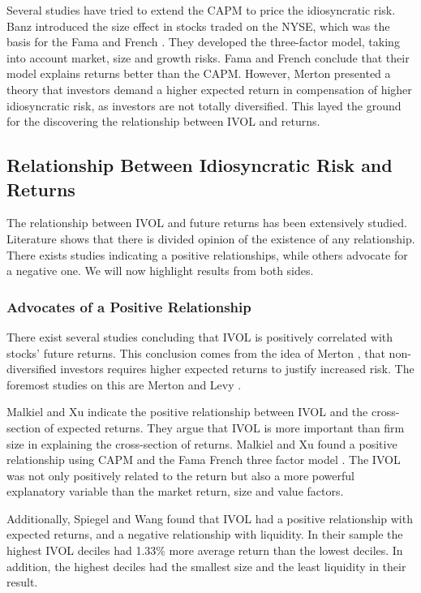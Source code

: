 Several studies have tried to extend the CAPM to price the idiosyncratic risk. Banz \cite{banz} introduced the size effect in stocks traded on the NYSE, which was the basis for the Fama and French \cite{famafrench}. They developed the three-factor model, taking into account market, size and growth risks. Fama and French \cite{famafrench} conclude that their model explains returns better than the CAPM. However, Merton \cite{merton87} presented a theory that investors demand a higher expected return in compensation of higher idiosyncratic risk, as investors are not totally diversified. This layed the ground for the discovering the relationship between IVOL and returns.

\subsection{Relationship Between Idiosyncratic Risk and Returns}
The relationship between IVOL and future returns has been extensively studied. Literature shows that there is divided opinion of the existence of any relationship. There exists studies indicating a positive relationships, while others advocate for a negative one. We will now highlight results from both sides.

\subsubsection{Advocates of a Positive Relationship}
There exist several studies concluding that IVOL is positively correlated with stocks' future returns. This conclusion comes from the idea of Merton \cite{merton87}, that non-diversified investors requires higher expected returns to justify increased risk. The foremost studies on this are Merton \cite{merton73} and Levy \cite{levy}.

Malkiel and Xu \cite{malkielxu02} indicate the positive relationship between IVOL and the cross-section of expected returns. They argue that IVOL is more important than firm size in explaining the cross-section of returns. Malkiel and Xu \cite{malkielxu04} found a positive relationship using CAPM and the Fama French three factor model \cite{famafrench}. The IVOL was not only positively related to the return but also a more powerful explanatory variable than the market return, size and value factors.
 
Additionally, Spiegel and Wang \cite{spiegelwang} found that IVOL had a positive relationship with expected returns, and a negative relationship with liquidity. In their sample the highest IVOL deciles had 1.33\% more average return than the lowest deciles. In addition, the highest deciles had the smallest size and the least liquidity in their result. 

